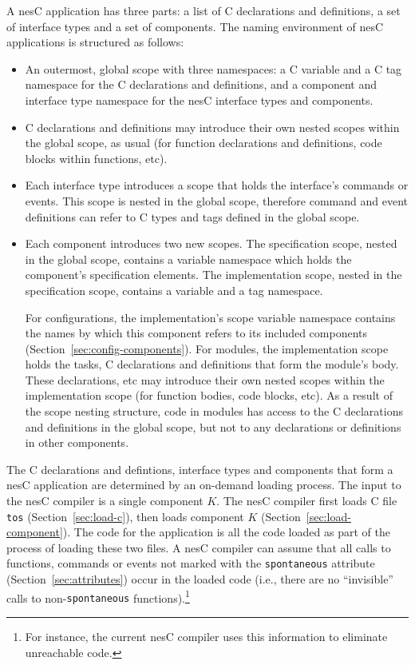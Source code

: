 \documentclass[11pt]{article}
\newcommand{\code}[1]{{\tt #1}}
\newcommand{\file}[1]{{\tt #1}}
\newcommand{\nesc}{nesC\xspace}
\begin{document}
A \nesc application has three parts: a list of C declarations and
definitions, a set of interface types and a set of components. The naming
environment of \nesc applications is structured as follows:
\begin{itemize}
\item An outermost, global scope with three namespaces: a C variable and a
C tag namespace for the C declarations and definitions, and a component and
interface type namespace for the \nesc interface types and components.
\item C declarations and definitions may introduce their own nested scopes
within the global scope, as usual (for function declarations and
definitions, code blocks within functions, etc).

\item Each interface type introduces a scope that holds the interface's
commands or events. This scope is nested in the global scope, therefore
command and event definitions can refer to C types and tags defined in the
global scope.

\item Each component introduces two new scopes. The specification scope,
nested in the global scope, contains a variable namespace which holds the
component's specification elements. The implementation scope, nested in the
specification scope, contains a variable and a tag namespace. 

For configurations, the implementation's scope variable namespace contains
the names by which this component refers to its included components
(Section~\ref{sec:config-components}). For modules, the implementation
scope holds the tasks, C declarations and definitions that form the
module's body. These declarations, etc may introduce their own nested
scopes within the implementation scope (for function bodies, code blocks,
etc). As a result of the scope nesting structure, code in modules has
access to the C declarations and definitions in the global scope, but not
to any declarations or definitions in other components.
\end{itemize}

The C declarations and defintions, interface types and components that form
a \nesc application are determined by an on-demand loading process. The
input to the \nesc compiler is a single component $K$. The \nesc compiler
first loads C file \file{tos} (Section~\ref{sec:load-c}), then loads
component $K$ (Section~\ref{sec:load-component}). The code for the
application is all the code loaded as part of the process of loading these
two files. A \nesc compiler can assume that all calls to functions,
commands or events not marked with the \code{spontaneous} attribute
(Section~\ref{sec:attributes}) occur in the loaded code (i.e., there are no
``invisible'' calls to non-\code{spontaneous} functions).\footnote{For
instance, the current \nesc compiler uses this information to eliminate
unreachable code.}
\end{document}
